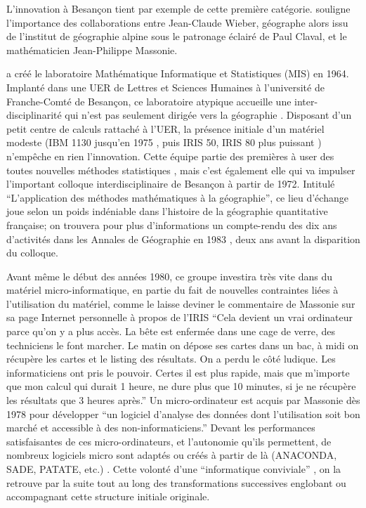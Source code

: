 L'innovation à Besançon tient par exemple de cette première catégorie. \textcite[131]{Cuyala2014} souligne l’importance des collaborations entre Jean-Claude Wieber, géographe alors issu de l’institut de géographie alpine sous le patronage éclairé de Paul Claval, et le mathématicien Jean-Philippe Massonie.

\textcite{Massonie1986} a créé le laboratoire Mathématique Informatique et Statistiques (MIS) en 1964. Implanté dans une UER de Lettres et Sciences Humaines à l’université de Franche-Comté de Besançon, ce laboratoire atypique accueille une inter-disciplinarité qui n'est pas seulement dirigée vers la géographie . Disposant d’un petit centre de calculs rattaché à l'UER, la présence initiale d'un matériel modeste (IBM 1130 jusqu'en 1975 \autocite[22]{Wieber1980}, puis IRIS 50, IRIS 80 plus puissant \autocite{Massonie1986}) n'empêche en rien l'innovation. Cette équipe partie des premières à user des toutes nouvelles méthodes statistiques \autocite{Massonie1971}, mais c'est également elle qui va impulser l'important colloque interdisciplinaire de Besançon à partir de 1972. Intitulé \enquote{L'application des méthodes mathématiques à la géographie}, ce lieu d'échange joue selon \autocite[331]{Cuyala2014} un poids indéniable dans l'histoire de la géographie quantitative française; on trouvera pour plus d'informations un compte-rendu des dix ans d'activités dans les Annales de Géographie en 1983 \autocite{Massonie1983}, deux ans avant la disparition du colloque.

Avant même le début des années 1980, ce groupe investira très vite dans du matériel micro-informatique, en partie du fait de nouvelles contraintes liées à l'utilisation du matériel, comme le laisse deviner le commentaire de Massonie sur sa page Internet personnelle à propos de l'IRIS \enquote{Cela devient un vrai ordinateur parce qu'on y a plus accès. La bête est enfermée dans une cage de verre, des techniciens le font marcher. Le matin on dépose ses cartes dans un bac, à midi on récupère les cartes et le listing des résultats. On a perdu le côté ludique. Les informaticiens ont pris le pouvoir. Certes il est plus rapide, mais que m'importe que mon calcul qui durait 1 heure, ne dure plus que 10 minutes, si je ne récupère les résultats que 3 heures après.} Un micro-ordinateur est acquis par Massonie dès 1978 pour développer \enquote{un logiciel d'analyse des données dont l'utilisation soit bon marché et accessible à des non-informaticiens.} Devant les performances satisfaisantes de ces micro-ordinateurs, et l'autonomie qu'ils permettent, de nombreux logiciels micro sont adaptés ou créés à partir de là (ANACONDA, SADE, PATATE, etc.) \autocite{Massonie1986}. Cette volonté d'une \enquote{informatique conviviale} \autocite{TSH1984}, on la retrouve par la suite tout au long des transformations successives englobant ou accompagnant cette structure initiale originale.

